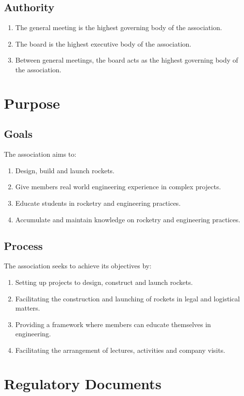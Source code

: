 \subsection{Authority}
\begin{enumerate}
  \item The general meeting is the highest governing body of the association.
  \item The board is the highest executive body of the association.
  \item Between general meetings, the board acts as the highest governing body of the association. 
\end{enumerate}

\section*{Purpose}

\subsection{Goals}
The association aims to:
\begin{enumerate}
  \item Design, build and launch rockets.
  \item Give members real world engineering experience in complex projects.
  \item Educate students in rocketry and engineering practices.
  \item Accumulate and maintain knowledge on rocketry and engineering practices.
\end{enumerate}

\subsection{Process}
The association seeks to achieve its objectives by: 
\begin{enumerate}
  \item Setting up projects to design, construct and launch rockets.
  \item Facilitating the construction and launching of rockets in legal and logistical matters.
  \item Providing a framework where members can educate themselves in engineering.
  \item Facilitating the arrangement of lectures, activities and company visits.
\end{enumerate}

\section*{Regulatory Documents}
